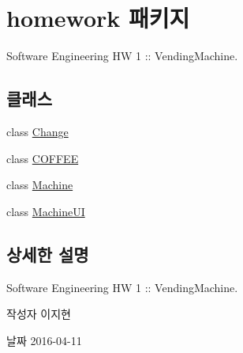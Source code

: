 \hypertarget{namespacehomework}{}\section{homework 패키지}
\label{namespacehomework}


Software Engineering HW 1 \+:\+: Vending\+Machine.  


\subsection*{클래스}
\begin{DoxyCompactItemize}
\item 
class \hyperlink{classhomework_1_1_change}{Change}
\item 
class \hyperlink{classhomework_1_1_c_o_f_f_e_e}{C\+O\+F\+F\+EE}
\item 
class \hyperlink{classhomework_1_1_machine}{Machine}
\item 
class \hyperlink{classhomework_1_1_machine_u_i}{Machine\+UI}
\end{DoxyCompactItemize}


\subsection{상세한 설명}
Software Engineering HW 1 \+:\+: Vending\+Machine. 

\begin{DoxyAuthor}{작성자}
이지현 
\end{DoxyAuthor}
\begin{DoxyDate}{날짜}
2016-\/04-\/11 
\end{DoxyDate}
